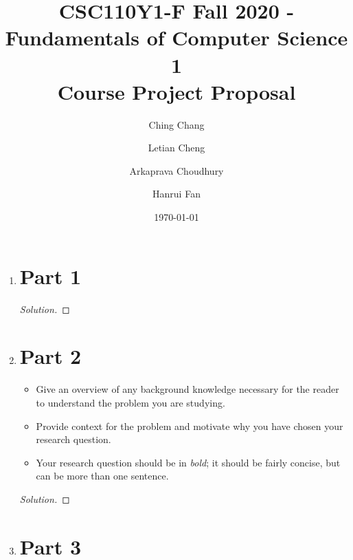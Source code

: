 \documentclass[12pt]{article}
\title{CSC110Y1-F Fall 2020 - Fundamentals of Computer Science 1 \\ Course Project Proposal}
\author{
  Ching Chang\\
  \and
  Letian Cheng\\
  \and
  Arkaprava Choudhury\\
  \and
  Hanrui Fan
}
\date{\today}
\newenvironment{solution}
  {\renewcommand\qedsymbol{$\blacksquare$}
  \begin{proof}[Solution]}
  {\end{proof}}
\renewcommand\qedsymbol{$\blacksquare$}
\begin{document}
\maketitle

\newpage


\begin{enumerate}
\item \section*{Part 1}



\begin{solution}

\end{solution}

\newpage

\item \section*{Part 2}

\begin{itemize}
  \item Give an overview of any background knowledge necessary for the reader to understand the problem you are studying.
  \item Provide context for the problem and motivate why you have chosen your research question.
  \item Your research question should be in \emph{bold}; it should be fairly concise, but can be more than one sentence.
\end{itemize}

\begin{solution}

\end{solution}

\newpage

\item \section*{Part 3}


\end{enumerate}
\end{document}
